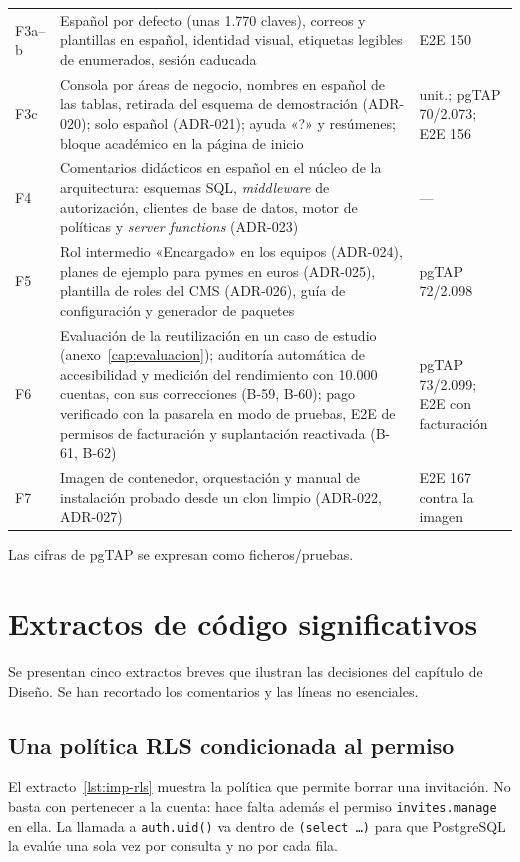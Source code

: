 \begin{longtable}{@{}l>{\raggedright\arraybackslash}p{9.6cm}>{\raggedright\arraybackslash}p{3.0cm}@{}}
  F3a--b & Español por defecto (unas 1.770 claves), correos y plantillas en español, identidad visual, etiquetas legibles de enumerados, sesión caducada & E2E 150 \\
  F3c & Consola por áreas de negocio, nombres en español de las tablas, retirada del esquema de demostración (ADR-020); solo español (ADR-021); ayuda «?» y resúmenes; bloque académico en la página de inicio & 1.691 unit.; pgTAP 70/2.073; E2E 156 \\
  F4 & Comentarios didácticos en español en el núcleo de la arquitectura: esquemas SQL, \textit{middleware} de autorización, clientes de base de datos, motor de políticas y \textit{server functions} (ADR-023) & --- \\
  F5 & Rol intermedio «Encargado» en los equipos (ADR-024), planes de ejemplo para pymes en euros (ADR-025), plantilla de roles del CMS (ADR-026), guía de configuración y generador de paquetes & pgTAP 72/2.098 \\
  F6 & Evaluación de la reutilización en un caso de estudio (anexo~\ref{cap:evaluacion}); auditoría automática de accesibilidad y medición del rendimiento con 10.000 cuentas, con sus correcciones (B-59, B-60); pago verificado con la pasarela en modo de pruebas, E2E de permisos de facturación y suplantación reactivada (B-61, B-62) & pgTAP 73/2.099; E2E con facturación \\
  F7 & Imagen de contenedor, orquestación y manual de instalación probado desde un clon limpio (ADR-022, ADR-027) & E2E 167 contra la imagen \\
\end{longtable}

Las cifras de pgTAP se expresan como ficheros/pruebas.

\section{Extractos de código significativos}
\label{sec:imp-extractos}

Se presentan cinco extractos breves que ilustran las decisiones del capítulo
de Diseño. Se han recortado los comentarios y las líneas no esenciales.

\subsection{Una política RLS condicionada al permiso}

El extracto~\ref{lst:imp-rls} muestra la política que permite borrar una
invitación. No basta con pertenecer a la cuenta: hace falta además el permiso
\texttt{invites.manage} en ella. La llamada a \texttt{auth.uid()} va dentro de
\texttt{(select \ldots)} para que PostgreSQL la evalúe una sola vez por
consulta y no por cada fila.

